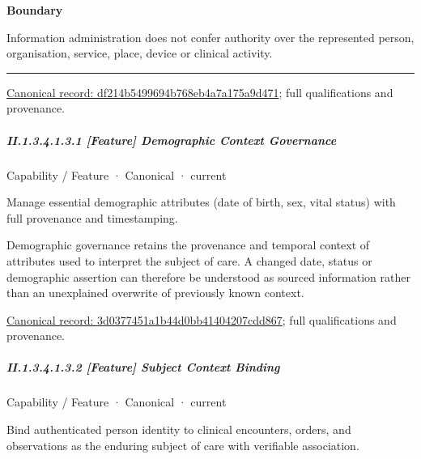 \textbf{Boundary}



Information administration does not confer authority over the represented person, organisation, service, place, device or clinical activity.



\medskip\hrule\medskip

{\footnotesize \href{../../../../continuum/strategy/capability/df214b5499694b768eb4a7a175a9d471.md}{Canonical record: df214b5499694b768eb4a7a175a9d471}; full qualifications and provenance.}\par
\subparagraph*{II.1.3.4.1.3.1 [Feature] Demographic Context Governance}
\label{navigation:II.1.3.4.1.3.1}

\label{element:3d0377451a1b44d0bb41404207cdd867}
{\small Capability / Feature · Canonical · current}\par

Manage essential demographic attributes (date of birth, sex, vital status) with full provenance and timestamping.



Demographic governance retains the provenance and temporal context of attributes used to interpret the subject of care. A changed date, status or demographic assertion can therefore be understood as sourced information rather than an unexplained overwrite of previously known context.


{\footnotesize \href{../../../../continuum/strategy/capability/feature/3d0377451a1b44d0bb41404207cdd867.md}{Canonical record: 3d0377451a1b44d0bb41404207cdd867}; full qualifications and provenance.}\par
\subparagraph*{II.1.3.4.1.3.2 [Feature] Subject Context Binding}
\label{navigation:II.1.3.4.1.3.2}

\label{element:5d956689bc714e2d8be4fff7766c0b2d}
{\small Capability / Feature · Canonical · current}\par

Bind authenticated person identity to clinical encounters, orders, and observations as the enduring subject of care with verifiable association.




